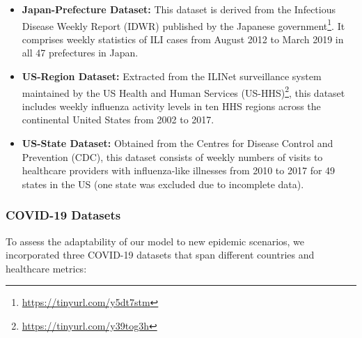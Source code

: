 \documentclass[a4paper,fleqn]{cas-dc}
\begin{document}
\begin{itemize}
    \item \textbf{Japan-Prefecture Dataset:} This dataset is derived from the Infectious Disease Weekly Report (IDWR) published by the Japanese government\footnote{\url{https://tinyurl.com/y5dt7stm}}. It comprises weekly statistics of ILI cases from August 2012 to March 2019 in all 47 prefectures in Japan. 
    
    \item \textbf{US-Region Dataset:} Extracted from the ILINet surveillance system maintained by the US Health and Human Services (US-HHS)\footnote{\url{https://tinyurl.com/y39tog3h}}, this dataset includes weekly influenza activity levels in ten HHS regions across the continental United States from 2002 to 2017. 

    \item \textbf{US-State Dataset:} Obtained from the Centres for Disease Control and Prevention (CDC), this dataset consists of weekly numbers of visits to healthcare providers with influenza-like illnesses from 2010 to 2017 for 49 states in the US (one state was excluded due to incomplete data).
\end{itemize}

\subsubsection{COVID-19 Datasets}
To assess the adaptability of our model to new epidemic scenarios, we incorporated three COVID-19 datasets that span different countries and healthcare metrics:
\end{document}
